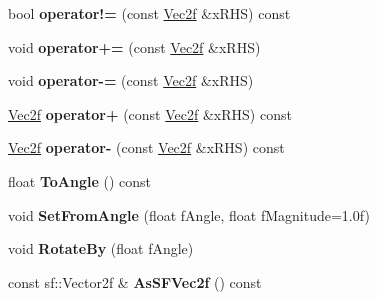 \begin{DoxyCompactItemize}
\item 
\hypertarget{struct_k_g_e_1_1_vec2f_abe9aa2d7614f797fbc98a315f7f7c262}{bool {\bfseries operator!=} (const \hyperlink{struct_k_g_e_1_1_vec2f}{Vec2f} \&x\-R\-H\-S) const }\label{struct_k_g_e_1_1_vec2f_abe9aa2d7614f797fbc98a315f7f7c262}

\item 
\hypertarget{struct_k_g_e_1_1_vec2f_a632f6b063debf7935a798e05c14984eb}{void {\bfseries operator+=} (const \hyperlink{struct_k_g_e_1_1_vec2f}{Vec2f} \&x\-R\-H\-S)}\label{struct_k_g_e_1_1_vec2f_a632f6b063debf7935a798e05c14984eb}

\item 
\hypertarget{struct_k_g_e_1_1_vec2f_a76d6dce3a9a27be5d5bc422af3568127}{void {\bfseries operator-\/=} (const \hyperlink{struct_k_g_e_1_1_vec2f}{Vec2f} \&x\-R\-H\-S)}\label{struct_k_g_e_1_1_vec2f_a76d6dce3a9a27be5d5bc422af3568127}

\item 
\hypertarget{struct_k_g_e_1_1_vec2f_a7bac4e9fccb38c4d9d3530b725df12e3}{\hyperlink{struct_k_g_e_1_1_vec2f}{Vec2f} {\bfseries operator+} (const \hyperlink{struct_k_g_e_1_1_vec2f}{Vec2f} \&x\-R\-H\-S) const }\label{struct_k_g_e_1_1_vec2f_a7bac4e9fccb38c4d9d3530b725df12e3}

\item 
\hypertarget{struct_k_g_e_1_1_vec2f_a781ea1f86fa2bb67a216aed98c825a19}{\hyperlink{struct_k_g_e_1_1_vec2f}{Vec2f} {\bfseries operator-\/} (const \hyperlink{struct_k_g_e_1_1_vec2f}{Vec2f} \&x\-R\-H\-S) const }\label{struct_k_g_e_1_1_vec2f_a781ea1f86fa2bb67a216aed98c825a19}

\item 
\hypertarget{struct_k_g_e_1_1_vec2f_a3ffb1b191ee357bf1819e3bf33184cdd}{float {\bfseries To\-Angle} () const }\label{struct_k_g_e_1_1_vec2f_a3ffb1b191ee357bf1819e3bf33184cdd}

\item 
\hypertarget{struct_k_g_e_1_1_vec2f_a914c2b85b3fd4de7f5b551a2abe04fa1}{void {\bfseries Set\-From\-Angle} (float f\-Angle, float f\-Magnitude=1.\-0f)}\label{struct_k_g_e_1_1_vec2f_a914c2b85b3fd4de7f5b551a2abe04fa1}

\item 
\hypertarget{struct_k_g_e_1_1_vec2f_ae488e5bc056d7fbd4ddc66ad29919045}{void {\bfseries Rotate\-By} (float f\-Angle)}\label{struct_k_g_e_1_1_vec2f_ae488e5bc056d7fbd4ddc66ad29919045}

\item 
\hypertarget{struct_k_g_e_1_1_vec2f_a2d4d63080909bf0ab73c9e8c401f410b}{const sf\-::\-Vector2f \& {\bfseries As\-S\-F\-Vec2f} () const }\label{struct_k_g_e_1_1_vec2f_a2d4d63080909bf0ab73c9e8c401f410b}


\end{DoxyCompactItemize}
